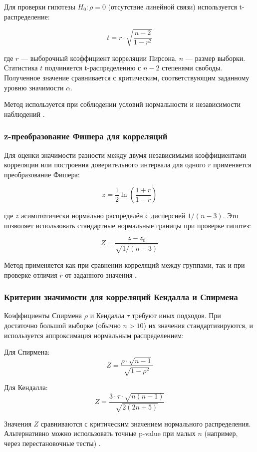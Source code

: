 Для проверки гипотезы $H_0: \rho = 0$ (отсутствие линейной связи) используется t-распределение:

\[
t = r \cdot \sqrt{\frac{n - 2}{1 - r^2}}
\]

где $r$ — выборочный коэффициент корреляции Пирсона, $n$ — размер выборки. Статистика $t$ подчиняется t-распределению с $n - 2$ степенями свободы. Полученное значение сравнивается с критическим, соответствующим заданному уровню значимости $\alpha$.

Метод используется при соблюдении условий нормальности и независимости наблюдений \cite{bonett2000}.

\subsubsection{z-преобразование Фишера для корреляций}

Для оценки значимости разности между двумя независимыми коэффициентами корреляции или построения доверительного интервала для одного $r$ применяется преобразование Фишера:

\[
z = \frac{1}{2} \ln\left(\frac{1 + r}{1 - r}\right)
\]

где $z$ асимптотически нормально распределён с дисперсией $1 / (n - 3)$. Это позволяет использовать стандартные нормальные границы при проверке гипотез:

\[
Z = \frac{z - z_0}{\sqrt{1 / (n - 3)}}
\]

Метод применяется как при сравнении корреляций между группами, так и при проверке отличия $r$ от заданного значения \cite{fisher1921}.

\subsubsection{Критерии значимости для корреляций Кендалла и Спирмена}

Коэффициенты Спирмена $\rho$ и Кендалла $\tau$ требуют иных подходов. При достаточно большой выборке (обычно $n > 10$) их значения стандартизируются, и используется аппроксимация нормальным распределением:

Для Спирмена:
\[
Z = \frac{\rho \cdot \sqrt{n - 1}}{\sqrt{1 - \rho^2}}
\]

Для Кендалла:
\[
Z = \frac{3 \cdot \tau \cdot \sqrt{n(n - 1)}}{\sqrt{2(2n + 5)}}
\]

Значения $Z$ сравниваются с критическим значением нормального распределения. Альтернативно можно использовать точные p-value при малых $n$ (например, через перестановочные тесты) \cite{zimmerman1997}.

